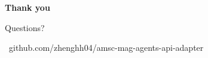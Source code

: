 

\begin{frame}[plain]
  \vfill
  \begin{center}
    {\Huge\bfseries\color{labnavy}Thank you}\par
    \vspace{10pt}
    {\large\color{midgray}Questions?}\par
    \vspace{16pt}
    {\footnotesize\color{midgray}\faGithub\ github.com/zhenghh04/amsc-mag-agents-api-adapter
    \quad\textbullet\quad \faEnvelope\ \deckemail}
  \end{center}
  \vfill
\end{frame}


